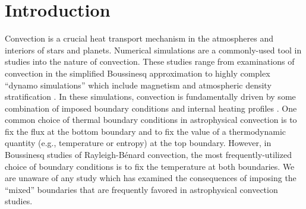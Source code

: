 \documentclass[aps, pre, onecolumn, nofootinbib, notitlepage, groupedaddress, amsfonts, amssymb, amsmath, longbibliography, superscriptaddress]{revtex4-1}
\newcommand{\RB}{Rayleigh-B\'{e}nard }
\begin{document}

\section{Introduction}
\label{sec:introduction}
Convection is a crucial heat transport mechanism in the atmospheres and interiors of stars and planets.
Numerical simulations are a commonly-used tool in studies into the nature of convection.
These studies range from examinations of convection in the simplified Boussinesq approximation \cite{spiegel&veronis1960, ahlers&all2009, plumley&julien2019} to highly complex ``dynamo simulations'' which include magnetism and atmospheric density stratification \cite{charbonneau2014, toomre2019}.
In these simulations, convection is fundamentally driven by some combination of imposed boundary conditions and internal heating profiles \cite{goluskin2015}.
One common choice of thermal boundary conditions in astrophysical convection \cite{glatzmaier&gilman1982, hurlburt&all1986, cattaneo&all1990, featherstone&hindman2016a, korre&all2019, wood&brummell2018, kapyla&all2019} is to fix the flux at the bottom boundary and to fix the value of a thermodynamic quantity (e.g., temperature or entropy) at the top boundary.
However, in Boussinesq studies of \RB convection, the most frequently-utilized choice of boundary conditions is to fix the temperature at both boundaries.
We are unaware of any study which has examined the consequences of imposing the ``mixed'' boundaries that are frequently favored in astrophysical convection studies.
\end{document}
